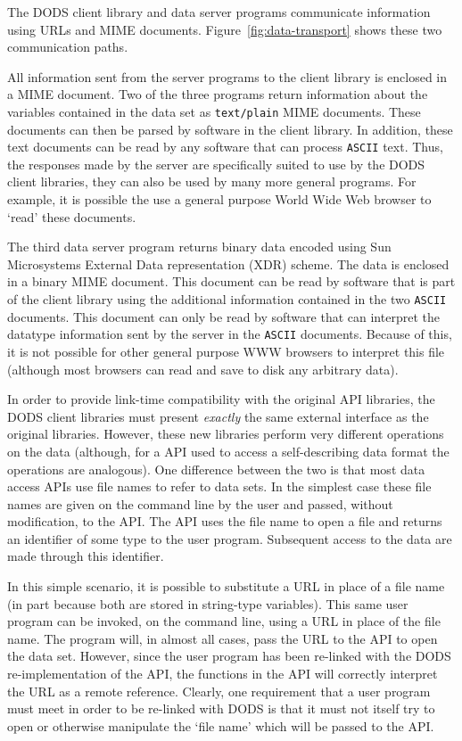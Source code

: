 The DODS client library and data server programs communicate information
using URLs and MIME\cite{rfc:mime} documents. Figure~\ref{fig:data-transport}
shows these two communication paths.

All information sent from the server programs to the client library is
enclosed in a MIME document. Two of the three programs return information
about the variables contained in the data set as {\tt text/plain} MIME
documents. These documents can then be parsed by software in the client
library. In addition, these text documents can be read by any software that
can process {\tt ASCII} text. Thus, the responses made by the server are
specifically suited to use by the DODS client libraries, they can also be
used by many more general programs. For example, it is possible the use a
general purpose World Wide Web browser to `read' these documents.

The third data server program returns binary data encoded using Sun
Microsystems External Data representation (XDR)\cite{sun:xdr} scheme. The
data is enclosed in a binary MIME document. This document can be read by
software that is part of the client library using the additional information
contained in the two {\tt ASCII} documents. This document can only be read by
software that can interpret the datatype information sent by the server in
the {\tt ASCII} documents. Because of this, it is not possible for other
general purpose WWW browsers to interpret this file (although most browsers
can read and save to disk any arbitrary data).

In order to provide link-time compatibility with the original API libraries,
the DODS client libraries must present {\em exactly\/} the same external
interface as the original libraries. However, these new libraries perform
very different operations on the data (although, for a API used to access a
self-describing data format the operations are analogous). One difference
between the two is that most data access APIs use file names to refer to data
sets. In the simplest case these file names are given on the command line by
the user and passed, without modification, to the API. The API uses the file
name to open a file and returns an identifier of some type to the user
program. Subsequent access to the data are made through this identifier.

In this simple scenario, it is possible to substitute a URL in place of a
file name (in part because both are stored in string-type variables). This
same user program can be invoked, on the command line, using a URL in place
of the file name. The program will, in almost all cases, pass the URL to the
API to open the data set. However, since the user program has been re-linked
with the DODS re-implementation of the API, the functions in the API will
correctly interpret the URL as a remote reference. Clearly, one requirement
that a user program must meet in order to be re-linked with DODS is that it
must not itself try to open or otherwise manipulate the `file name' which
will be passed to the API.

